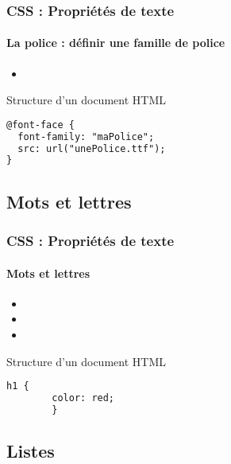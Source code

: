 \documentclass[xcolor=table]{beamer}
\begin{document}
\begin{frame}[fragile]
\frametitle{CSS : Propriétés de texte}
\framesubtitle{La police : définir une famille de police}

\begin{minipage}{0.60\textwidth}
	\begin{itemize}
		\item {}
	\end{itemize}
\end{minipage}
%
\begin{minipage}{0.38\textwidth}
\begin{block}{Structure d'un document HTML}
\lstset{escapeinside=**}
\scriptsize\bfseries
\begin{lstlisting}[language={html}]
@font-face {
  font-family: "maPolice";
  src: url("unePolice.ttf");
}
\end{lstlisting}
\end{block}
\end{minipage}
\end{frame}

\subsection{Mots et lettres}

\begin{frame}[fragile]
\frametitle{CSS : Propriétés de texte}
\framesubtitle{Mots et lettres}

\begin{minipage}{0.60\textwidth}
	\begin{itemize}
		\item {}
		\item {}
		\item {}
	\end{itemize}
\end{minipage}
%
\begin{minipage}{0.38\textwidth}
	\begin{block}{Structure d'un document HTML}
		\lstset{escapeinside=**}
		\scriptsize\bfseries
		\begin{lstlisting}[language={html}]
		h1 {
		color: red;
		}
		\end{lstlisting}
	\end{block}
\end{minipage}
\end{frame}

\subsection{Listes}
\end{document}
